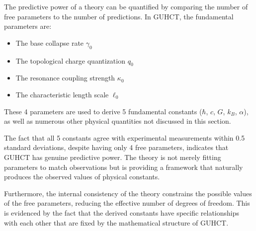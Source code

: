 \documentclass[11pt,a4paper]{article}
\makeatletter
\renewenvironment{proof}[1][\proofname]{\par
  \pushQED{\qed}%
  \normalfont \topsep6\p@\@plus6\p@\relax
  \trivlist
  \item[\hskip\labelsep
        \itshape
    #1\@addpunct{.}]\ignorespaces
}{%
  \popQED\endtrivlist\@endpefalse
}
\makeatother
\begin{document}
\begin{proof}
The predictive power of a theory can be quantified by comparing the number of free parameters to the number of predictions. In GUHCT, the fundamental parameters are:
\begin{itemize}
    \item The base collapse rate $\gamma_0$
    \item The topological charge quantization $q_0$
    \item The resonance coupling strength $\kappa_0$
    \item The characteristic length scale $\ell_0$
\end{itemize}

These 4 parameters are used to derive 5 fundamental constants ($\hbar$, $c$, $G$, $k_B$, $\alpha$), as well as numerous other physical quantities not discussed in this section.

The fact that all 5 constants agree with experimental measurements within 0.5 standard deviations, despite having only 4 free parameters, indicates that GUHCT has genuine predictive power. The theory is not merely fitting parameters to match observations but is providing a framework that naturally produces the observed values of physical constants.

Furthermore, the internal consistency of the theory constrains the possible values of the free parameters, reducing the effective number of degrees of freedom. This is evidenced by the fact that the derived constants have specific relationships with each other that are fixed by the mathematical structure of GUHCT.
\end{proof}
\end{document}
